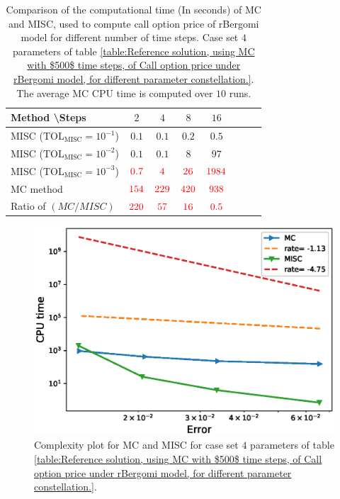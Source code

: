 \FloatBarrier
\begin{table}[h!]
	\centering
	\begin{tabular}{l*{6}{c}r}
		Method \textbackslash  Steps            & $2$ & $4$ & $8$ & $16$ &   \\
		\hline
		MISC ($\text{TOL}_{\text{MISC}}=10^{-1}$)  & $0.1$ & $0.1$ & $0.2$ & $0.5$ \\
		MISC ($\text{TOL}_{\text{MISC}}=10^{-2}$)  & $0.1$ & $0.1$ & $8$ & $97$ \\
		MISC ($\text{TOL}_{\text{MISC}}=10^{-3}$)  & $\red{0.7}$ & $\red{4}$ & $\red{26}$ & $\red{1984}$ \\
		\hline
		MC method   & $ \red{154}
		
		$  & $  \red{229}$  & $  \red{420}$ & $ \red{938}
		$  \\	
		\hline
		Ratio of $\left(MC/MISC \right)$ & $ \red{   220}
		
		$  & $  \red{
		 57
		}$  & $  \red{    16
		}$ & $ \red{ 0.5}
		$  \\	
				
		\hline
	\end{tabular}
	\caption{Comparison of the computational time (In seconds) of  MC and MISC, used to compute call option price of rBergomi model for different number of time steps. Case set $4$ parameters of table \ref{table:Reference solution, using MC with $500$ time steps, of Call option price under rBergomi model, for different parameter constellation.}. The average  MC CPU time is computed over $10$ runs. }
	\label{Comparsion of the computational time of  MC and MISC, used to compute Call option price of rBergomi model for different number of time steps. Case set5}
\end{table}

\FloatBarrier


	\begin{figure}[h!]
	\centering
	\includegraphics[width=0.35\linewidth]{./figures/rBergomi_Complexity_rates/set7/error_vs_time_set7}
	
	\caption{Complexity plot for   MC and MISC for case set $4$ parameters of table \ref{table:Reference solution, using MC with $500$ time steps, of Call option price under rBergomi model, for different parameter constellation.}.}
	\label{fig:Complexity plot for MC and MISC for Case set $5$ parameters}
\end{figure}
\FloatBarrier




